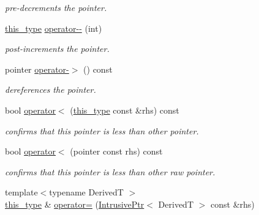 \begin{DoxyCompactItemize}
\begin{DoxyCompactList}\small\item\em pre-\/decrements the pointer. \end{DoxyCompactList}\item 
\hypertarget{classhryky_1_1_intrusive_ptr_a9e99a7d62e21d24050d46d2213d38538}{\hyperlink{classhryky_1_1_intrusive_ptr_a0fb00a7eafa8939e21653f677d1b2989}{this\-\_\-type} \hyperlink{classhryky_1_1_intrusive_ptr_a9e99a7d62e21d24050d46d2213d38538}{operator-\/-\/} (int)}\label{classhryky_1_1_intrusive_ptr_a9e99a7d62e21d24050d46d2213d38538}

\begin{DoxyCompactList}\small\item\em post-\/increments the pointer. \end{DoxyCompactList}\item 
\hypertarget{classhryky_1_1_intrusive_ptr_a1be03a526ff80fbca45eed3933199434}{pointer \hyperlink{classhryky_1_1_intrusive_ptr_a1be03a526ff80fbca45eed3933199434}{operator-\/$>$} () const }\label{classhryky_1_1_intrusive_ptr_a1be03a526ff80fbca45eed3933199434}

\begin{DoxyCompactList}\small\item\em dereferences the pointer. \end{DoxyCompactList}\item 
\hypertarget{classhryky_1_1_intrusive_ptr_ae0aa24c2d96b9db5d254280844c21272}{bool \hyperlink{classhryky_1_1_intrusive_ptr_ae0aa24c2d96b9db5d254280844c21272}{operator$<$} (\hyperlink{classhryky_1_1_intrusive_ptr_a0fb00a7eafa8939e21653f677d1b2989}{this\-\_\-type} const \&rhs) const }\label{classhryky_1_1_intrusive_ptr_ae0aa24c2d96b9db5d254280844c21272}

\begin{DoxyCompactList}\small\item\em confirms that this pointer is less than other pointer. \end{DoxyCompactList}\item 
\hypertarget{classhryky_1_1_intrusive_ptr_aa304734f29507d58aae31e346e13d0ae}{bool \hyperlink{classhryky_1_1_intrusive_ptr_aa304734f29507d58aae31e346e13d0ae}{operator$<$} (pointer const rhs) const }\label{classhryky_1_1_intrusive_ptr_aa304734f29507d58aae31e346e13d0ae}

\begin{DoxyCompactList}\small\item\em confirms that this pointer is less than other raw pointer. \end{DoxyCompactList}\item 
\hypertarget{classhryky_1_1_intrusive_ptr_aa738864278a9e6b6ab452cd010a23b86}{{\footnotesize template$<$typename Derived\-T $>$ }\\\hyperlink{classhryky_1_1_intrusive_ptr_a0fb00a7eafa8939e21653f677d1b2989}{this\-\_\-type} \& \hyperlink{classhryky_1_1_intrusive_ptr_aa738864278a9e6b6ab452cd010a23b86}{operator=} (\hyperlink{classhryky_1_1_intrusive_ptr}{Intrusive\-Ptr}$<$ Derived\-T $>$ const \&rhs)}\label{classhryky_1_1_intrusive_ptr_aa738864278a9e6b6ab452cd010a23b86}


\end{DoxyCompactItemize}
